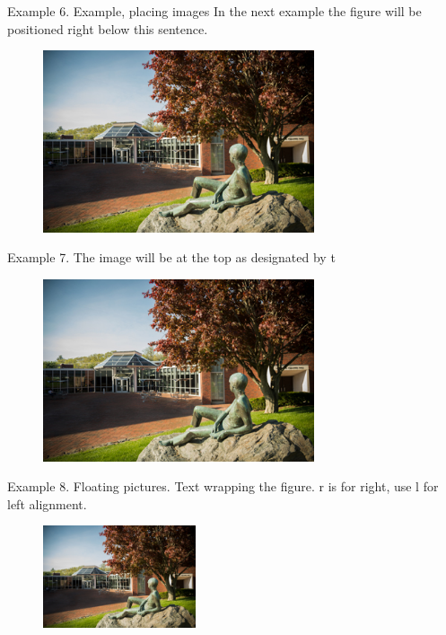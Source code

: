\documentclass{article}
\begin{document}
\newpage

Example 6. Example, placing images
In the next example the figure will be positioned right below this sentence.

\begin{figure}[h]
\includegraphics[width=8cm]{library}
\end{figure}

\newpage

Example 7. The image will be at the top as designated by t

\begin{figure}[t]
\centering
\includegraphics[width=8cm]{library}
\end{figure}

\newpage

Example 8. Floating pictures. Text wrapping the figure.  r is for right, use l for left alignment.

\begin{figure} %
    \centering
    \includegraphics[width=0.4\textwidth]{library}
\end{figure}
\end{document}
